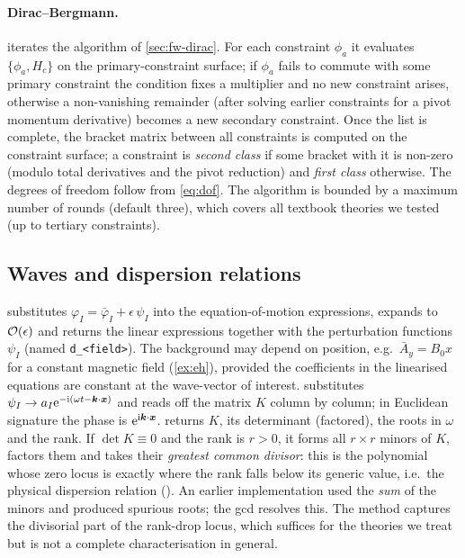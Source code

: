 \paragraph{Dirac--Bergmann.}  iterates the algorithm of \cref{sec:fw-dirac}. For each constraint $\phi_a$ it evaluates $\{\phi_a,H_c\}$ on the primary-constraint surface; if $\phi_a$ fails to commute with some primary constraint the condition fixes a multiplier and no new constraint arises, otherwise a non-vanishing remainder (after solving earlier constraints for a pivot momentum derivative) becomes a new secondary constraint. Once the list is complete, the bracket matrix between all constraints is computed on the constraint surface; a constraint is \emph{second class} if some bracket with it is non-zero (modulo total derivatives and the pivot reduction) and \emph{first class} otherwise. The degrees of freedom follow from \cref{eq:dof}. The algorithm is bounded by a maximum number of rounds (default three), which covers all textbook theories we tested (up to tertiary constraints).

\subsection{Waves and dispersion relations}
\label{sec:waves-impl}

 substitutes $\varphi_I=\bar\varphi_I+\epsilon\,\psi_I$ into the equation-of-motion expressions, expands to $\mathcal{O}(\epsilon)$ and returns the linear expressions together with the perturbation functions $\psi_I$ (named \texttt{d\_<field>}). The background may depend on position, e.g.\ $\bar A_y=B_0x$ for a constant magnetic field (\cref{ex:eh}), provided the coefficients in the linearised equations are constant at the wave-vector of interest.  substitutes $\psi_I\to a_I\mathrm{e}^{-\mathrm{i}(\omega t-\bm{k}\cdot\bm{x})}$ and reads off the matrix $K$ column by column; in Euclidean signature the phase is $\mathrm{e}^{\mathrm{i}\bm{k}\cdot\bm{x}}$.  returns $K$, its determinant (factored), the roots in $\omega$ and the rank. If $\det K\equiv0$ and the rank is $r>0$, it forms all $r\times r$ minors of $K$, factors them and takes their \emph{greatest common divisor}: this is the polynomial whose zero locus is exactly where the rank falls below its generic value, i.e.\ the physical dispersion relation (). An earlier implementation used the \emph{sum} of the minors and produced spurious roots; the gcd resolves this. The method captures the divisorial part of the rank-drop locus, which suffices for the theories we treat but is not a complete characterisation in general.


